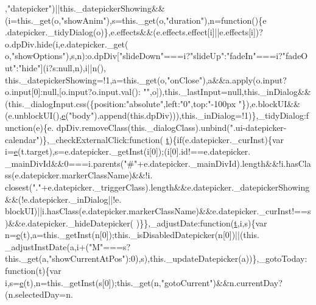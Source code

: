 \begin{DoxyCode}
      ,\textcolor{stringliteral}{"datepicker"})||this.\_datepickerShowing&&(i=this.\_get(o,\textcolor{stringliteral}{"showAnim"}),s=this.\_get(o,\textcolor{stringliteral}{"duration"}),n=\textcolor{keyword}{function}()\{e
      .datepicker.\_tidyDialog(o)\},e.effects&&(e.effects.effect[i]||e.effects[i])?o.dpDiv.hide(i,e.datepicker.\_get(
      o,\textcolor{stringliteral}{"showOptions"}),s,n):o.dpDiv[\textcolor{stringliteral}{"slideDown"}===i?\textcolor{stringliteral}{"slideUp"}:\textcolor{stringliteral}{"fadeIn"}===i?\textcolor{stringliteral}{"fadeOut"}:\textcolor{stringliteral}{"hide"}](i?s:null,n),i||n(),
      this.\_datepickerShowing=!1,a=this.\_get(o,\textcolor{stringliteral}{"onClose"}),a&&a.apply(o.input?o.input[0]:null,[o.input?o.input.val():\textcolor{stringliteral}{
      ""},o]),this.\_lastInput=null,this.\_inDialog&&(this.\_dialogInput.css(\{position:\textcolor{stringliteral}{"absolute"},left:\textcolor{stringliteral}{"0"},top:\textcolor{stringliteral}{"-100px
      "}\}),e.blockUI&&(e.unblockUI(),\hyperlink{jquery-ui_8min_8js_a2c038346d47955cbe2cb91e338edd7e1}{e}(\textcolor{stringliteral}{"body"}).append(this.dpDiv))),this.\_inDialog=!1)\},\_tidyDialog:\textcolor{keyword}{function}(e)\{e.
      dpDiv.removeClass(this.\_dialogClass).unbind(\textcolor{stringliteral}{".ui-datepicker-calendar"})\},\_checkExternalClick:\textcolor{keyword}{function}(
      \hyperlink{jquery-2_80_83_8min_8js_aaccc9105df5383111407fd5b41255e23}{t})\{\textcolor{keywordflow}{if}(e.datepicker.\_curInst)\{var i=\hyperlink{jquery-ui_8min_8js_a2c038346d47955cbe2cb91e338edd7e1}{e}(t.target),s=e.datepicker.\_getInst(i[0]);(i[0].id!==e.datepicker.
      \_mainDivId&&0===i.parents(\textcolor{stringliteral}{"#"}+e.datepicker.\_mainDivId).length&&!i.hasClass(e.datepicker.markerClassName)&&!i.
      closest(\textcolor{stringliteral}{"."}+e.datepicker.\_triggerClass).length&&e.datepicker.\_datepickerShowing&&(!e.datepicker.\_inDialog||!e.
      blockUI)||i.hasClass(e.datepicker.markerClassName)&&e.datepicker.\_curInst!==s)&&e.datepicker.\_hideDatepicker(
      )\}\},\_adjustDate:\textcolor{keyword}{function}(\hyperlink{jquery-2_80_83_8min_8js_aaccc9105df5383111407fd5b41255e23}{t},i,s)\{var n=\hyperlink{jquery-ui_8min_8js_a2c038346d47955cbe2cb91e338edd7e1}{e}(t),a=this.\_getInst(n[0]);this.\_isDisabledDatepicker(n[0])||(this.
      \_adjustInstDate(a,i+(\textcolor{stringliteral}{"M"}===s?this.\_get(a,\textcolor{stringliteral}{"showCurrentAtPos"}):0),s),this.\_updateDatepicker(a))\},\_gotoToday:\textcolor{keyword}{
      function}(t)\{var i,s=\hyperlink{jquery-ui_8min_8js_a2c038346d47955cbe2cb91e338edd7e1}{e}(t),n=this.\_getInst(s[0]);this.\_get(n,\textcolor{stringliteral}{"gotoCurrent"})&&n.currentDay?(n.selectedDay=n.

\end{DoxyCode}

